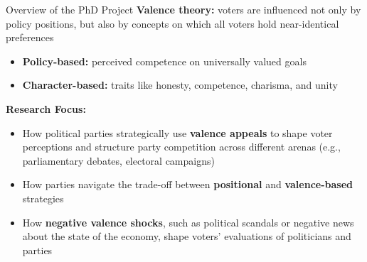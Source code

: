 \documentclass[9pt, aspectratio=169]{beamer}
\newcommand{\customcites}[1]{\textcolor{blue}{\footnotesize\parencites{#1}}}
\begin{document}
\begin{frame}{Overview of the PhD Project}
    \textbf{Valence theory:} voters are influenced not only by policy positions, but also by concepts on which all voters hold near-identical preferences \customcites{stokes1992valence, clark2009valence} \vspace{0.2cm}
        \begin{itemize}
            \item \textbf{Policy-based:} perceived competence on universally valued goals \customcites{groseclose2001model, jacoby2009public, clark2009valence} \vspace{0.2cm}
            \item \textbf{Character-based:} traits like honesty, competence, charisma, and unity \customcites{clark2009valence, adams2001theory}
        \end{itemize}
\vspace{0.3cm}
\textbf{Research Focus:} \vspace{0.1cm}
\begin{itemize}
    \item How political parties strategically use \textbf{valence appeals} to shape voter perceptions and structure party competition across different arenas (e.g., parliamentary debates, electoral campaigns) \vspace{0.2cm}
    \item How parties navigate the trade-off between \textbf{positional} and \textbf{valence-based} strategies \vspace{0.2cm}
    \item How \textbf{negative valence shocks}, such as political scandals or negative news about the state of the economy, shape voters’ evaluations of politicians and parties
\end{itemize}

\end{frame}

        
\end{document}
